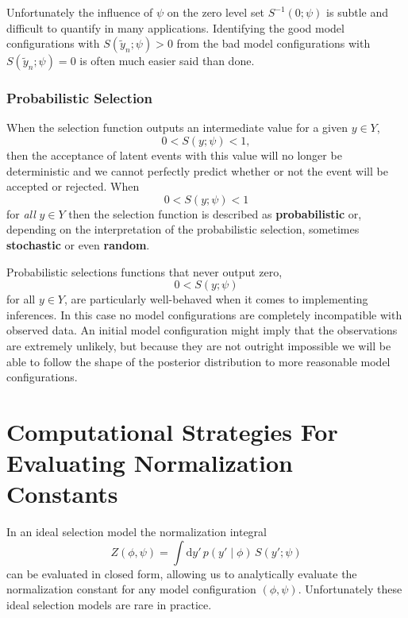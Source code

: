 \documentclass[
  letterpaper,
  DIV=11,
  numbers=noendperiod]{scrartcl}
\begin{document}
Unfortunately the influence of \(\psi\) on the zero level set
\(S^{-1}(0; \psi)\) is subtle and difficult to quantify in many
applications. Identifying the good model configurations with
\(S(\tilde{y}_{n}; \psi) > 0\) from the bad model configurations with
\(S(\tilde{y}_{n}; \psi) = 0\) is often much easier said than done.

\subsubsection{Probabilistic Selection}\label{probabilistic-selection}

When the selection function outputs an intermediate value for a given
\(y \in Y\), \[
0 < S(y; \psi) < 1,
\] then the acceptance of latent events with this value will no longer
be deterministic and we cannot perfectly predict whether or not the
event will be accepted or rejected. When \[
0 < S(y; \psi) < 1
\] for \emph{all} \(y \in Y\) then the selection function is described
as \textbf{probabilistic} or, depending on the interpretation of the
probabilistic selection, sometimes \textbf{stochastic} or even
\textbf{random}.

Probabilistic selections functions that never output zero, \[
0 < S(y; \psi)
\] for all \(y \in Y\), are particularly well-behaved when it comes to
implementing inferences. In this case no model configurations are
completely incompatible with observed data. An initial model
configuration might imply that the observations are extremely unlikely,
but because they are not outright impossible we will be able to follow
the shape of the posterior distribution to more reasonable model
configurations.

\section{Computational Strategies For Evaluating Normalization
Constants}\label{sec:estimation}

In an ideal selection model the normalization integral \[
Z(\phi, \psi) = \int \mathrm{d}y' \, p(y' \mid \phi) \, S(y'; \psi )
\] can be evaluated in closed form, allowing us to analytically evaluate
the normalization constant for any model configuration \((\phi, \psi)\).
Unfortunately these ideal selection models are rare in practice.
\end{document}
